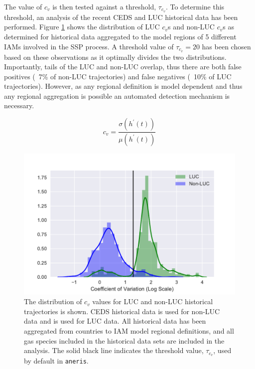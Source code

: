 \documentclass[review]{elsarticle}
\newcommand{\code}[1]{\lstinline[basicstyle=\ttfamily\color{black}]|#1|}
\begin{document}
The value of $c_v$ is then tested against a threshold, $\tau_{c_v}$. To
determine this threshold, an analysis of the recent CEDS and LUC historical data
has been performed. Figure \ref{fig:cov} shows the distribution of LUC $c_v$s
and non-LUC $c_v$s as determined for historical data aggregated to the model
regions of 5 different IAMs involved in the SSP process. A threshold value of
$\tau_{c_v} = 20$ has been chosen based on these observations as it
optimally divides the two distributions. Importantly, tails of the LUC and
non-LUC overlap, thus there are both false positives (~7\% of non-LUC
trajectories) and false negatives (~10\% of LUC trajectories). However, as any
regional definition is model dependent and thus any regional aggregation is
possible an automated detection mechanism is necessary.

\begin{equation}\label{eqs:cov}
    c_v =  \frac{\sigma(h^{\prime}(t))}{\mu(h^{\prime}(t))}
\end{equation}


\begin{figure}
  \begin{center}
    \includegraphics[width=\textwidth]{cov.pdf}
    \caption[]{
      \label{fig:cov}
      The distribution of $c_v$ values for LUC and non-LUC historical
      trajectories is shown. CEDS historical data \cite{hoesly_historical_2017}
      is used for non-LUC data and \cite{van_marle_historic_2017} is used for
      LUC data. All historical data has been aggregated from countries to IAM
      model regional definitions, and all gas species included in the historical
      data sets are included in the analysis. The solid black line indicates the
      threshold value, $\tau_{c_v}$, used by default in \code{aneris}.  }
  \end{center}
\end{figure}
\end{document}
